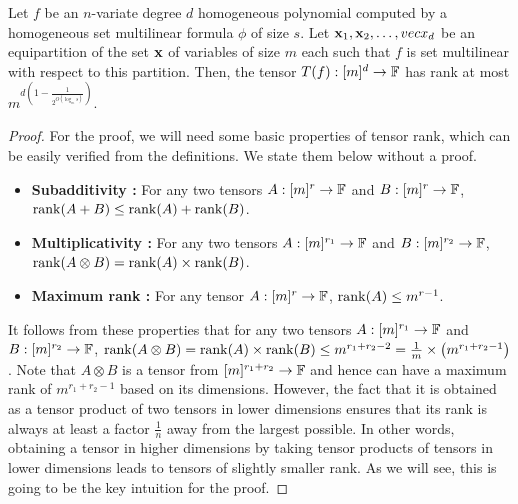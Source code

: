 \begin{lemma}\label{lem:set-multilinear tensor rank}
Let $f$ be an $n$-variate degree $d$ homogeneous polynomial computed by a homogeneous set multilinear formula $\phi$ of size $s$. Let $\mathbf{x}_1, \mathbf{x}_2, \ldots, vecx_d$ be an equipartition of the set $\mathbf{x}$ of variables of size $m$ each such that $f$ is set multilinear with respect to this partition. Then, the tensor $T(f) : [m]^d \rightarrow \mathbb{F}$ has rank at most $m^{d\left(1- \frac{1}{2^{O(\log_m s)}}\right)}$. 
\end{lemma}

\begin{proof}
For the proof, we will need some basic properties of tensor rank, which can be easily verified from the definitions. We state them below without a proof. 
\begin{itemize}
\item {\bf Subadditivity :} For any two tensors $A:[m]^r \rightarrow \mathbb{F}$ and $B:[m]^r \rightarrow \mathbb{F}$, $\operatorname{rank}(A+B) \leq \operatorname{rank}(A) + \operatorname{rank}(B)$.
\item {\bf Multiplicativity :} For any two tensors $A:[m]^{r_1} \rightarrow \mathbb{F}$ and $B:[m]^{r_2} \rightarrow \mathbb{F}$, $\operatorname{rank}(A\otimes B) = \operatorname{rank}(A) \times \operatorname{rank}(B)$.
\item {\bf Maximum rank :} For any tensor $A:[m]^{r} \rightarrow \mathbb{F}$, $\operatorname{rank}(A) \leq m^{r-1}$.  
\end{itemize}

It follows from these properties that for any two tensors $A:[m]^{r_1} \rightarrow \mathbb{F}$ and $B:[m]^{r_2} \rightarrow \mathbb{F}$, $\operatorname{rank}(A\otimes B) = \operatorname{rank}(A) \times \operatorname{rank}(B) \leq m^{r_1 + r_2 -2} = \frac{1}{m}\times \left( m^{r_1 + r_2 -1}\right)$. Note that $A\otimes B$ is a tensor from $[m]^{r_1 + r_2} \rightarrow \mathbb{F}$ and hence can have a maximum rank of $m^{r_1 + r_2 -1}$ based on its dimensions. However, the fact that it is obtained as a tensor product of two tensors in lower dimensions ensures that its rank is always at least a factor $\frac{1}{n}$ away from the largest possible. In other words, obtaining a tensor in higher dimensions by taking tensor products of tensors in lower dimensions leads to tensors of slightly smaller rank. As we will see, this is going to be the key intuition for the proof. 


\end{proof}
